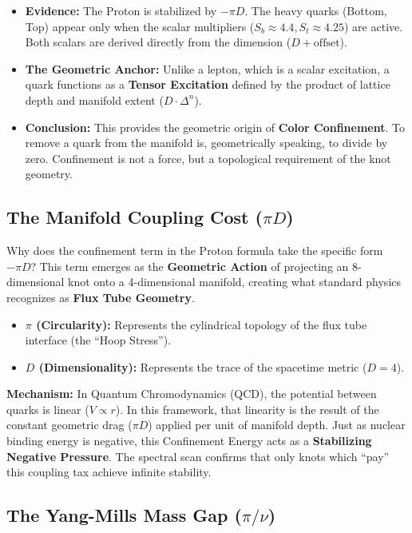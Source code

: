 \begin{itemize}
    \item \textbf{Evidence:} The Proton is stabilized by $-\pi D$. The heavy quarks (Bottom, Top) appear only when the scalar multipliers ($S_b \approx 4.4, S_t \approx 4.25$) are active. Both scalars are derived directly from the dimension ($D + \text{offset}$).
    \item \textbf{The Geometric Anchor:} Unlike a lepton, which is a scalar excitation, a quark functions as a \textbf{Tensor Excitation} defined by the product of lattice depth and manifold extent ($D \cdot \Delta^n$).
    \item \textbf{Conclusion:} This provides the geometric origin of \textbf{Color Confinement}. To remove a quark from the manifold is, geometrically speaking, to divide by zero. Confinement is not a force, but a topological requirement of the knot geometry.
\end{itemize}

\subsection{The Manifold Coupling Cost (\texorpdfstring{$\pi D$}{piD})}

Why does the confinement term in the Proton formula take the specific form $-\pi D$? This term emerges as the \textbf{Geometric Action} of projecting an 8-dimensional knot onto a 4-dimensional manifold, creating what standard physics recognizes as \textbf{Flux Tube Geometry}.

\begin{itemize}
    \item \textbf{$\pi$ (Circularity):} Represents the cylindrical topology of the flux tube interface (the ``Hoop Stress'').
    \item \textbf{$D$ (Dimensionality):} Represents the trace of the spacetime metric ($D=4$).
\end{itemize}

\textbf{Mechanism:} In Quantum Chromodynamics (QCD), the potential between quarks is linear ($V \propto r$). In this framework, that linearity is the result of the constant geometric drag ($\pi D$) applied per unit of manifold depth. Just as nuclear binding energy is negative, this Confinement Energy acts as a \textbf{Stabilizing Negative Pressure}. The spectral scan confirms that only knots which ``pay'' this coupling tax achieve infinite stability.

\subsection{The Yang-Mills Mass Gap (\texorpdfstring{$\pi/\nu$}{pinu})}


